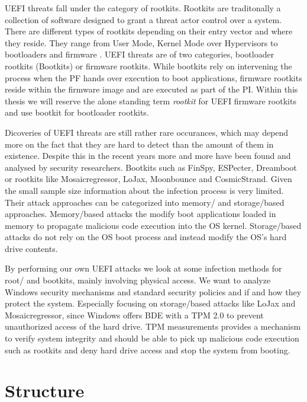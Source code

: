 \ac{UEFI} threats fall under the category of rootkits.
Rootkits are traditonally a collection of software designed to grant a threat actor control over a system.
There are different types of rootkits depending on their entry vector and where they reside.
They range from User Mode, Kernel Mode over Hypervisors to bootloaders and firmware \cite{crowdstrike, techtarget, microsoft-secure-the-windows-boot-process}.
\ac{UEFI} threats are of two categories, bootloader rootkits (Bootkits) or firmware rootkits.
While bootkits rely on intervening the process when the \ac{PF} hands over execution to boot applications, firmware rootkits reside within the firmware image and are executed as part of the \ac{PI}.
Within this thesis we will reserve the alone standing term \emph{rootkit} for \ac{UEFI} firmware rootkits and use bootkit for bootloader rootkits.

Dicoveries of \ac{UEFI} threats are still rather rare occurances, which may depend more on the fact that they are hard to detect than the amount of them in existence.
Despite this in the recent years more and more have been found and analysed by security researchers.
Bootkits such as FinSpy, ESPecter, Dreamboot or rootkits like Mosaicregressor, LoJax, Moonbounce and CosmicStrand.
Given the small sample size information about the infection process is very limited.
Their attack approaches can be categorized into memory\-/ and storage\-/based approaches.
Memory\-/based attacks the modify boot applications loaded in memory to propagate malicious code execution into the \ac{OS} kernel.
Storage\-/based attacks do not rely on the \ac{OS} boot process and instead modify the \ac{OS}'s hard drive contents.

By performing our own \ac{UEFI} attacks we look at some infection methods for root\-/ and bootkits, mainly involving physical access.
We want to analyze Windows security mechanisms and standard security policies and if and how they protect the system.
Especially focusing on storage\-/based attacks like LoJax and Mosaicregressor, since Windows offers \ac{BDE} with a \ac{TPM} 2.0 to prevent unauthorized access of the hard drive.
\ac{TPM} measurements provides a mechanism to verify system integrity and should be able to pick up malicious code execution such as rootkits and deny hard drive access and stop the system from booting.

\section*{Structure}

